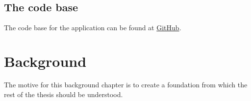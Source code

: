 \documentclass[english]{ifimaster}
\begin{document}
\section{The code base}
The code base for the application can be found at \href{https://github.com/xjohannes/The-Genomic-HyperBrowser-state-plugin}{GitHub}.












\chapter{Background}
The motive for this background chapter is to create a foundation from which the rest of the thesis should be understood.
\end{document}
